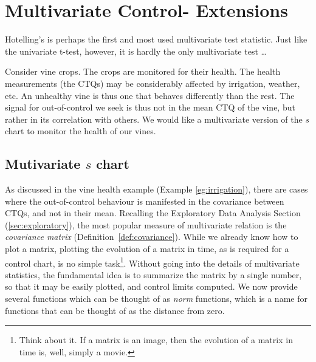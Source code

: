 \section[Multivariate extensions]{Multivariate Control- Extensions}

Hotelling's \tsq is perhaps the first and most used multivariate test statistic.
Just like the univariate t-test, however, it is hardly the only multivariate test \dots




\begin{example}
\label{eg:irrigation}
Consider vine crops.
The crops are monitored for their health.
The health measurements (the CTQs) may be considerably affected by irrigation, weather, etc.
An unhealthy vine is thus one that behaves differently than the rest. 
The signal for out-of-control we seek is thus not in the mean CTQ of the vine, but rather in its correlation with others. 
We would like a multivariate version of the $s$ chart to monitor the health of our vines.  
\end{example}




\subsection[Mutivariate s chart]{Mutivariate $s$ chart}
\label{sec:multivarite_s}

As discussed in the vine health example (Example \ref{eg:irrigation}), there are cases where the out-of-control behaviour is manifested in the covariance between CTQs, and not in their mean.
Recalling the Exploratory Data Analysis Section (\ref{sec:exploratory}), the most popular measure of multivariate relation is the \emph{covariance matrix} (Definition~\ref{def:covariance}).
While we already know how to plot a matrix, plotting the evolution of a matrix in time, as is required for a control chart, is no simple task\footnote{Think about it. If a matrix is an image, then the evolution of a matrix in time is, well, simply a movie.}. 
Without going into the details of multivariate statistics, the fundamental idea is to summarize the matrix by a single number, so that it may be easily plotted, and control limits computed. 
We now provide several functions which can be thought of as \emph{norm} functions, which is a name for functions that can be thought of as the distance from zero. 




